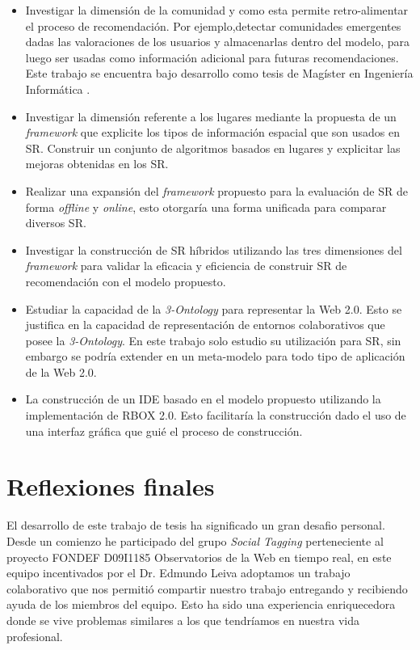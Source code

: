 \begin{itemize}
\item Investigar la dimensión de la comunidad y como esta permite retro-alimentar el proceso de recomendación. Por ejemplo,detectar comunidades emergentes dadas las valoraciones de los usuarios y almacenarlas dentro del modelo, para luego ser usadas como información adicional para futuras recomendaciones. Este trabajo se encuentra bajo desarrollo como tesis de Magíster en Ingeniería Informática \citep{Ochoa:2013}.

\item Investigar la dimensión referente a los lugares mediante la propuesta de un \textit{framework} que explicite los tipos de información espacial que son usados en SR. Construir un conjunto de algoritmos basados en lugares y explicitar las mejoras obtenidas en los SR.

\item Realizar una expansión del \textit{framework} propuesto para la evaluación de SR de forma \textit{offline} y \textit{online}, esto otorgaría una forma unificada para comparar diversos SR.

\item Investigar la construcción de SR híbridos utilizando las tres dimensiones del \textit{framework} para validar la eficacia y eficiencia de construir SR de recomendación con el modelo propuesto.

\item Estudiar la capacidad  de la \textit{3-Ontology} para representar la Web 2.0. Esto se justifica en la capacidad de representación de entornos colaborativos que posee la \textit{3-Ontology}. En este trabajo solo estudio su utilización para SR, sin embargo se podría extender en un meta-modelo para todo tipo de aplicación de la Web 2.0.

\item La construcción de un IDE basado en el modelo propuesto utilizando la implementación de RBOX 2.0. Esto facilitaría la construcción dado el uso de una interfaz gráfica que guié el proceso de construcción.

\end{itemize}

\section{Reflexiones finales}

El desarrollo de este trabajo de tesis ha significado un gran desafio personal. Desde un comienzo he participado del grupo \textit{Social Tagging} perteneciente al proyecto FONDEF D09I1185 Observatorios de la Web en tiempo real, en este equipo incentivados por el Dr. Edmundo Leiva adoptamos un trabajo colaborativo que nos permitió compartir nuestro trabajo entregando y recibiendo ayuda de los miembros del equipo. Esto ha sido una experiencia enriquecedora donde se vive problemas similares a los que tendríamos en nuestra vida profesional. 

